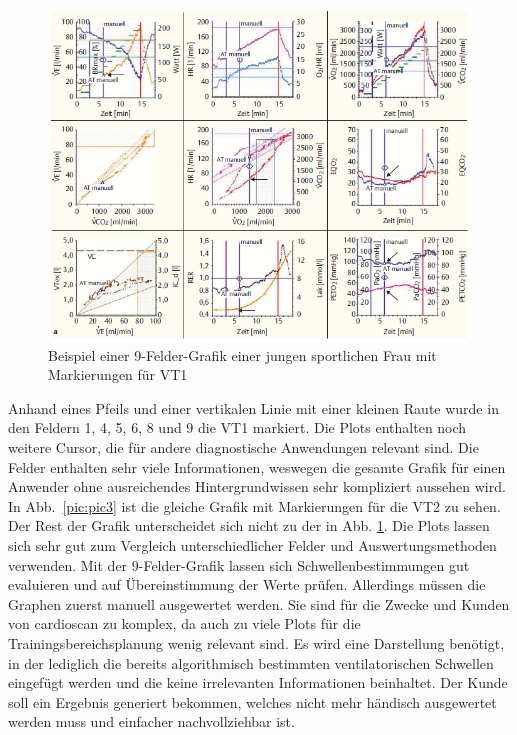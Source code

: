 \begin{figure}[H]
	\centering
	\includegraphics[width=135mm]{Bilder/9fieldcomplex.png}
	\caption[Beispielhafte 9-Felder-Grafik mit Markierungen für VT1]{Beispiel einer 9-Felder-Grafik einer jungen sportlichen Frau mit Markierungen für VT1~\cite{Kroidl.2015}}
	\label{pic:pic2}
\end{figure}
%
Anhand eines Pfeils und einer vertikalen Linie mit einer kleinen Raute wurde in den Feldern 1, 4, 5, 6, 8 und 9 die VT1 markiert. Die Plots enthalten noch weitere Cursor, die für andere diagnostische Anwendungen relevant sind. Die Felder enthalten sehr viele Informationen, weswegen die gesamte Grafik für einen Anwender ohne ausreichendes Hintergrundwissen sehr kompliziert aussehen wird. In Abb.~\ref{pic:pic3} ist die gleiche Grafik mit Markierungen für die VT2 zu sehen. Der Rest der Grafik unterscheidet sich nicht zu der in Abb. \ref{pic:pic2}. Die Plots lassen sich sehr gut zum Vergleich unterschiedlicher Felder und Auswertungsmethoden verwenden. Mit der 9-Felder-Grafik lassen sich Schwellenbestimmungen gut evaluieren und auf Übereinstimmung der Werte prüfen. Allerdings müssen die Graphen zuerst manuell ausgewertet werden. Sie sind für die Zwecke und Kunden von cardioscan zu komplex, da auch zu viele Plots für die Trainingsbereichsplanung wenig relevant sind. Es wird eine Darstellung benötigt, in der lediglich die bereits algorithmisch bestimmten ventilatorischen Schwellen eingefügt werden und die keine irrelevanten Informationen beinhaltet. Der Kunde soll ein Ergebnis generiert bekommen, welches nicht mehr händisch ausgewertet werden muss und einfacher nachvollziehbar ist.

